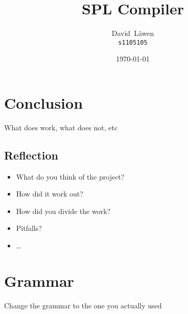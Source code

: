 \documentclass[dvipsnames]{report}
\author{%
	David~L\"awen\\
	\small\texttt{s1105105}
}
\date{\today}
\title{SPL Compiler}
\begin{document}
\maketitle%

\tableofcontents%












\chapter{Conclusion} \label{chp:conclusion}
What does work, what does not, etc

\section{Reflection} \label{chp:reflection}
\begin{itemize}
	\item What do you think of the project?
	\item How did it work out?
	\item How did you divide the work?
	\item Pitfalls?
	\item \ldots
\end{itemize}




\appendix
\chapter{Grammar} \label{chp:grammar}
Change the grammar to the one you actually used
\end{document}
